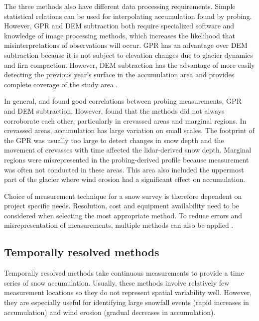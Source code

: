 \documentclass{sfuthesis}
\begin{document}
\begin{appendices}
The three methods also have different data processing requirements. Simple statistical relations can be used for interpolating accumulation found by probing. However, GPR and DEM subtraction both require specialized software and knowledge of image processing methods, which increases the likelihood that misinterpretations of observations will occur. GPR has an advantage over DEM subtraction because it is not subject to elevation changes due to glacier dynamics and firn compaction. However, DEM subtraction has the advantage of more easily detecting the previous year's surface in the accumulation area and provides complete coverage of the study area \citep{Sold2013}. 

In general, \cite{Machguth2006} and \cite{Sold2013} found good correlations between probing measurements, GPR and DEM subtraction. However, \citep{Sold2013} found that the methods did not always corroborate each other, particularly in crevassed areas and marginal regions. In crevassed areas, accumulation has large variation on small scales. The footprint of the GPR was usually too large to detect changes in snow depth and the movement of crevasses with time affected the lidar-derived snow depth. Marginal regions were misrepresented in the probing-derived profile because measurement was often not conducted in these areas. This area also included the uppermost part of the glacier where wind erosion had a significant effect on accumulation. 

Choice of measurement technique for a snow survey is therefore dependent on project specific needs. Resolution, cost and equipment availability need to be considered when selecting the most appropriate method. To reduce errors and misrepresentation of measurements, multiple methods can also be applied \citep{Machguth2006}. 

\subsection{Temporally resolved methods}
Temporally resolved methods take continuous measurements to provide a time series of snow accumulation. Usually, these methods involve relatively few measurement locations so they do not represent spatial variability well. However, they are especially useful for identifying large snowfall events (rapid increases in accumulation) and wind erosion (gradual decreases in accumulation). 


\end{appendices}
\end{document}
